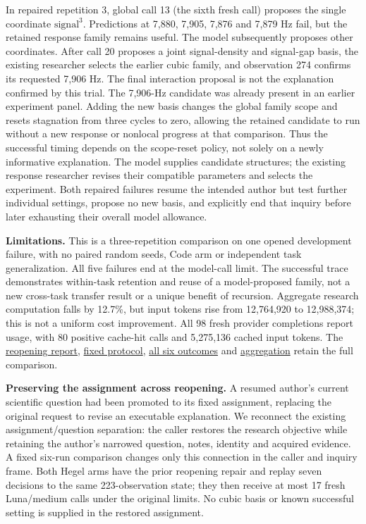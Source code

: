 \documentclass[twoside,11pt]{article}
\begin{document}
In repaired repetition 3, global call 13 (the sixth fresh call) proposes the single coordinate \(\mathrm{signal}^3\). Predictions at 7,880, 7,905, 7,876 and 7,879 Hz fail, but the retained response family remains useful. The model subsequently proposes other coordinates. After call 20 proposes a joint signal-density and signal-gap basis, the existing researcher selects the earlier cubic family, and observation 274 confirms its requested 7,906 Hz. The final interaction proposal is not the explanation confirmed by this trial. The 7,906-Hz candidate was already present in an earlier experiment panel. Adding the new basis changes the global family scope and resets stagnation from three cycles to zero, allowing the retained candidate to run without a new response or nonlocal progress at that comparison. Thus the successful timing depends on the scope-reset policy, not solely on a newly informative explanation. The model supplies candidate structures; the existing response researcher revises their compatible parameters and selects the experiment. Both repaired failures resume the intended author but test further individual settings, propose no new basis, and explicitly end that inquiry before later exhausting their overall model allowance.


\textbf{Limitations.} This is a three-repetition comparison on one opened development failure, with no paired random seeds, Code arm or independent task generalization. All five failures end at the model-call limit. The successful trace demonstrates within-task retention and reuse of a model-proposed family, not a new cross-task transfer result or a unique benefit of recursion. Aggregate research computation falls by 12.7\%, but input tokens rise from 12,764,920 to 12,988,374; this is not a uniform cost improvement. All 98 fresh provider completions report usage, with 80 positive cache-hit calls and 5,275,136 cached input tokens. The \hyperlink{artifact-127}{reopening report}, \hyperlink{artifact-128}{fixed protocol}, \hyperlink{artifact-129}{all six outcomes} and \hyperlink{artifact-130}{aggregation} retain the full comparison.


\textbf{Preserving the assignment across reopening.} A resumed author's current scientific question had been promoted to its fixed assignment, replacing the original request to revise an executable explanation. We reconnect the existing assignment/question separation: the caller restores the research objective while retaining the author's narrowed question, notes, identity and acquired evidence. A fixed six-run comparison changes only this connection in the caller and inquiry frame. Both Hegel arms have the prior reopening repair and replay seven decisions to the same 223-observation state; they then receive at most 17 fresh Luna/medium calls under the original limits. No cubic basis or known successful setting is supplied in the restored assignment.
\end{document}
